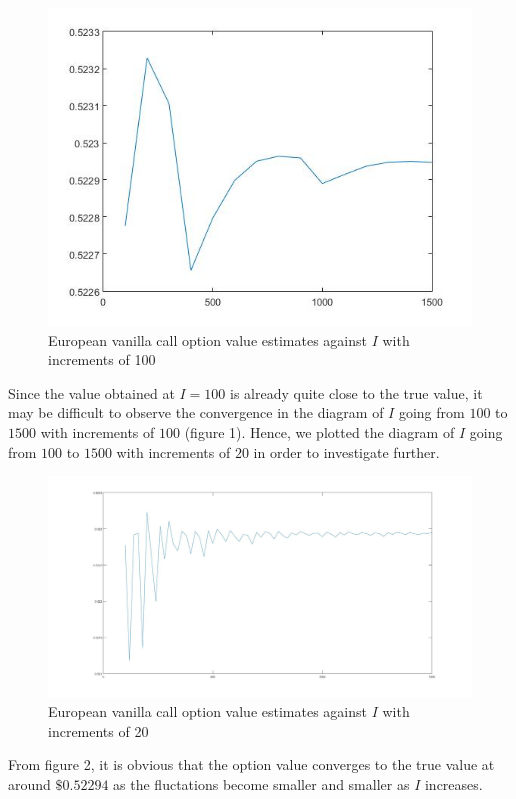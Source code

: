 \begin{figure}[htbp!]
	\centering
	\includegraphics[scale=0.7]{smallPlot.jpg}
	\caption{European vanilla call option value estimates against $I$ with increments of 100}
\end{figure}

Since the value obtained at $I = 100$ is already quite close to the true value, it may be difficult to observe the convergence in the diagram of $I$ going from $100$ to $1500$ with increments of $100$ (figure 1). Hence, we plotted the diagram of $I$ going from $100$ to $1500$ with increments of $20$ in order to investigate further.

\begin{figure}[htbp!]
	\centering
	\includegraphics[scale=0.2]{largePlot.jpg}
	\caption{European vanilla call option value estimates against $I$ with increments of 20}
\end{figure}

From figure 2, it is obvious that the option value converges to the true value at around $\$0.52294$ as the fluctations become smaller and smaller as $I$ increases.

